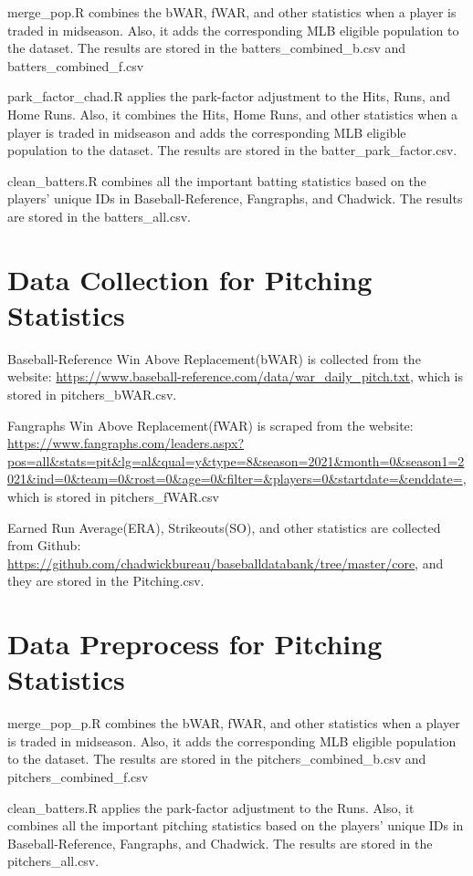 \documentclass{article}
\begin{document}
merge\_pop.R combines the bWAR, fWAR, and other statistics when a player is traded in midseason. Also, it adds the corresponding MLB eligible population to the dataset. The results are stored in the batters\_combined\_b.csv and batters\_combined\_f.csv

\bigskip

park\_factor\_chad.R applies the park-factor adjustment to the Hits, Runs, and Home Runs. Also, it combines the Hits, Home Runs, and other statistics when a player is traded in midseason and adds the corresponding MLB eligible population to the dataset. The results are stored in the batter\_park\_factor.csv. 

\bigskip

clean\_batters.R combines all the important batting statistics based on the players' unique IDs in Baseball-Reference, Fangraphs, and Chadwick. The results are stored in the batters\_all.csv. 

\section{Data Collection for Pitching Statistics}

Baseball-Reference Win Above Replacement(bWAR) is collected from the website: \url{https://www.baseball-reference.com/data/war_daily_pitch.txt}, which is stored in pitchers\_bWAR.csv. 

\bigskip

Fangraphs Win Above Replacement(fWAR) is scraped from the website: \url {https://www.fangraphs.com/leaders.aspx?pos=all&stats=pit&lg=al&qual=y&type=8&season=2021&month=0&season1=2021&ind=0&team=0&rost=0&age=0&filter=&players=0&startdate=&enddate=}, which is stored in pitchers\_fWAR.csv

\bigskip

Earned Run Average(ERA), Strikeouts(SO), and other statistics are collected from Github: \url{https://github.com/chadwickbureau/baseballdatabank/tree/master/core}, and they are stored in the Pitching.csv. 

\section{Data Preprocess for Pitching Statistics}


merge\_pop\_p.R combines the bWAR, fWAR, and other statistics when a player is traded in midseason. Also, it adds the corresponding MLB eligible population to the dataset. The results are stored in the pitchers\_combined\_b.csv and pitchers\_combined\_f.csv

\bigskip

clean\_batters.R applies the park-factor adjustment to the Runs. Also, it combines all the important pitching statistics based on the players' unique IDs in Baseball-Reference, Fangraphs, and Chadwick. The results are stored in the pitchers\_all.csv. 
\end{document}
